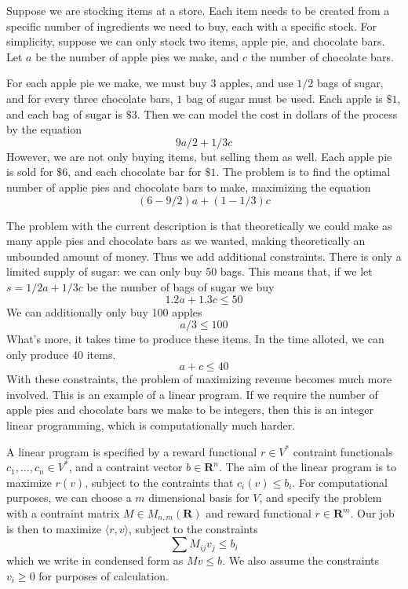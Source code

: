     \begin{example}
    Suppose we are stocking items at a store. Each item needs to be created from a specific number of ingredients we need to buy, each with a specific stock. For simplicity, suppose we can only stock two items, apple pie, and chocolate bars. Let $a$ be the number of apple pies we make, and $c$ the number of chocolate bars.

    For each apple pie we make, we must buy $3$ apples, and use $1/2$ bags of sugar, and for every three chocolate bars, $1$ bag of sugar must be used. Each apple is $\$1$, and each bag of sugar is $\$3$. Then we can model the cost in dollars of the process by the equation
    \[ 9a/2 + 1/3c \]
    However, we are not only buying items, but selling them as well. Each apple pie is sold for $\$6$, and each chocolate bar for $\$1$. The problem is to find the optimal number of applie pies and chocolate bars to make, maximizing the equation
    \[ (6 - 9/2)a + (1 - 1/3)c \]

    The problem with the current description is that theoretically we could make as many apple pies and chocolate bars as we wanted, making theoretically an unbounded amount of money. Thus we add additional constraints. There is only a limited supply of sugar: we can only buy 50 bags. This means that, if we let $s = 1/2a + 1/3c$ be the number of bags of sugar we buy
    \[ 1.2a + 1.3c \leq 50 \]
    We can additionally only buy 100 apples
    \[ a/3 \leq 100 \]
    What's more, it takes time to produce these items. In the time alloted, we can only produce 40 items.
    \[ a + c \leq 40 \]
    With these constraints, the problem of maximizing revenue becomes much more involved. This is an example of a linear program. If we require the number of apple pies and chocolate bars we make to be integers, then this is an integer linear programming, which is computationally much harder.
    \end{example}

    A linear program is specified by a reward functional $r \in V^*$ contraint functionals $c_1, \dots, c_n \in V^*$, and a contraint vector $b \in \mathbf{R}^n$. The aim of the linear program is to maximize $r(v)$, subject to the contraints that $c_i(v) \leq b_i$. For computational purposes, we can choose a $m$ dimensional basis for $V$, and specify the problem with a contraint matrix $M \in M_{n,m}(\mathbf{R})$ and reward functional $r \in \mathbf{R}^m$. Our job is then to maximize $\langle r, v \rangle$, subject to the constraints
    \[ \sum M_{ij} v_j \leq b_i \]
    which we write in condensed form as $Mv \leq b$. We also assume the constraints $v_i \geq 0$ for purposes of calculation.

